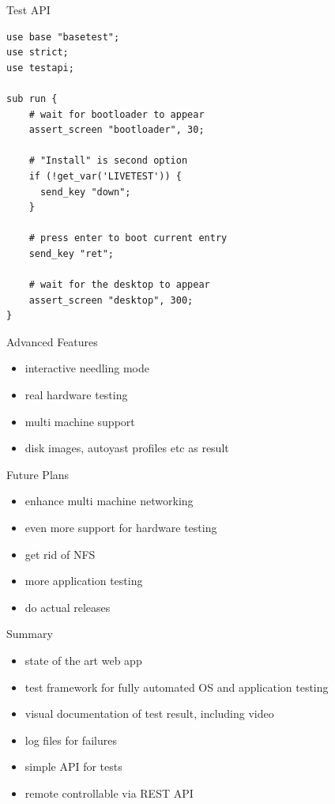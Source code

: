 \documentclass[
]{beamer}
\begin{document}
\begin{frame}[fragile]{Test API}
  \lstset{style=myperl}
  \begin{lstlisting}
use base "basetest";
use strict;
use testapi;

sub run {
    # wait for bootloader to appear
    assert_screen "bootloader", 30;

    # "Install" is second option
    if (!get_var('LIVETEST')) {
      send_key "down";
    }

    # press enter to boot current entry
    send_key "ret";

    # wait for the desktop to appear
    assert_screen "desktop", 300;
}
  \end{lstlisting}
\end{frame}

\begin{frame}{Advanced Features}
  \begin{itemize}
    \item interactive needling mode
    \item real hardware testing
    \item multi machine support
    \item disk images, autoyast profiles etc as result
  \end{itemize}
\end{frame}

\begin{frame}{Future Plans}
  \begin{itemize}
    \item enhance multi machine networking
    \item even more support for hardware testing
    \item get rid of NFS
    \item more application testing
    \item do actual releases
  \end{itemize}
\end{frame}

\begin{frame}{Summary}
  \begin{itemize}
    \item state of the art web app
    \item test framework for fully automated OS and application testing
    \item visual documentation of test result, including video
    \item log files for failures
    \item simple API for tests
    \item remote controllable via REST API
  \end{itemize}
\end{frame}
\end{document}
